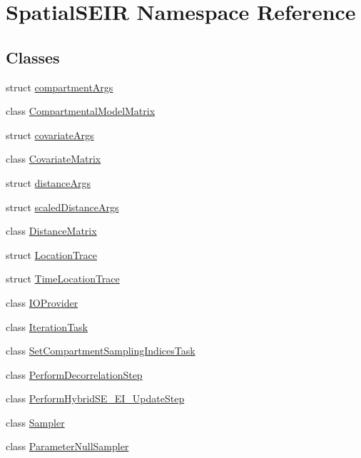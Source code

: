 \hypertarget{namespaceSpatialSEIR}{\section{Spatial\-S\-E\-I\-R Namespace Reference}
\label{namespaceSpatialSEIR}
}
\subsection*{Classes}
\begin{DoxyCompactItemize}
\item 
struct \hyperlink{structSpatialSEIR_1_1compartmentArgs}{compartment\-Args}
\item 
class \hyperlink{classSpatialSEIR_1_1CompartmentalModelMatrix}{Compartmental\-Model\-Matrix}
\item 
struct \hyperlink{structSpatialSEIR_1_1covariateArgs}{covariate\-Args}
\item 
class \hyperlink{classSpatialSEIR_1_1CovariateMatrix}{Covariate\-Matrix}
\item 
struct \hyperlink{structSpatialSEIR_1_1distanceArgs}{distance\-Args}
\item 
struct \hyperlink{structSpatialSEIR_1_1scaledDistanceArgs}{scaled\-Distance\-Args}
\item 
class \hyperlink{classSpatialSEIR_1_1DistanceMatrix}{Distance\-Matrix}
\item 
struct \hyperlink{structSpatialSEIR_1_1LocationTrace}{Location\-Trace}
\item 
struct \hyperlink{structSpatialSEIR_1_1TimeLocationTrace}{Time\-Location\-Trace}
\item 
class \hyperlink{classSpatialSEIR_1_1IOProvider}{I\-O\-Provider}
\item 
class \hyperlink{classSpatialSEIR_1_1IterationTask}{Iteration\-Task}
\item 
class \hyperlink{classSpatialSEIR_1_1SetCompartmentSamplingIndicesTask}{Set\-Compartment\-Sampling\-Indices\-Task}
\item 
class \hyperlink{classSpatialSEIR_1_1PerformDecorrelationStep}{Perform\-Decorrelation\-Step}
\item 
class \hyperlink{classSpatialSEIR_1_1PerformHybridSE__EI__UpdateStep}{Perform\-Hybrid\-S\-E\-\_\-\-E\-I\-\_\-\-Update\-Step}
\item 
class \hyperlink{classSpatialSEIR_1_1Sampler}{Sampler}
\item 
class \hyperlink{classSpatialSEIR_1_1ParameterNullSampler}{Parameter\-Null\-Sampler}

\end{DoxyCompactItemize}
